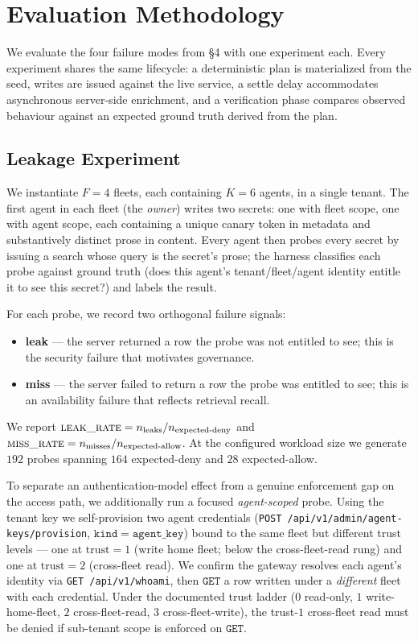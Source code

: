 \documentclass[10pt,twocolumn,letterpaper]{article}
\begin{document}
\section{Evaluation Methodology}
\label{sec:method}

We evaluate the four failure modes from \S4 with one experiment each. Every experiment shares the same lifecycle: a deterministic plan is materialized from the seed, writes are issued against the live service, a settle delay accommodates asynchronous server-side enrichment, and a verification phase compares observed behaviour against an expected ground truth derived from the plan.

\subsection{Leakage Experiment}

We instantiate \(F = 4\) fleets, each containing \(K = 6\) agents, in a single tenant. The first agent in each fleet (the \emph{owner}) writes two secrets: one with fleet scope, one with agent scope, each containing a unique canary token in metadata and substantively distinct prose in content. Every agent then probes every secret by issuing a search whose query is the secret's prose; the harness classifies each probe against ground truth (does this agent's tenant/fleet/agent identity entitle it to see this secret?) and labels the result.

For each probe, we record two orthogonal failure signals:
\begin{itemize}
    \item \textbf{leak} --- the server returned a row the probe was not entitled to see; this is the security failure that motivates governance.
    \item \textbf{miss} --- the server failed to return a row the probe was entitled to see; this is an availability failure that reflects retrieval recall.
\end{itemize}

We report \(\textsc{leak\_rate} = n_{\text{leaks}} / n_{\text{expected-deny}}\) and \(\textsc{miss\_rate} = n_{\text{misses}} / n_{\text{expected-allow}}\). At the configured workload size we generate \(192\) probes spanning \(164\) expected-deny and \(28\) expected-allow.

To separate an authentication-model effect from a genuine enforcement gap on the access path, we additionally run a focused \emph{agent-scoped} probe. Using the tenant key we self-provision two agent credentials (\texttt{POST /api/v1/admin/agent-keys/provision}, \(\mathtt{kind{=}agent\_key}\)) bound to the same fleet but different trust levels --- one at \(\text{trust}=1\) (write home fleet; below the cross-fleet-read rung) and one at \(\text{trust}=2\) (cross-fleet read). We confirm the gateway resolves each agent's identity via \texttt{GET /api/v1/whoami}, then \(\mathtt{GET}\) a row written under a \emph{different} fleet with each credential. Under the documented trust ladder (\(0\) read-only, \(1\) write-home-fleet, \(2\) cross-fleet-read, \(3\) cross-fleet-write), the trust-\(1\) cross-fleet read must be denied if sub-tenant scope is enforced on \(\mathtt{GET}\).
\end{document}
